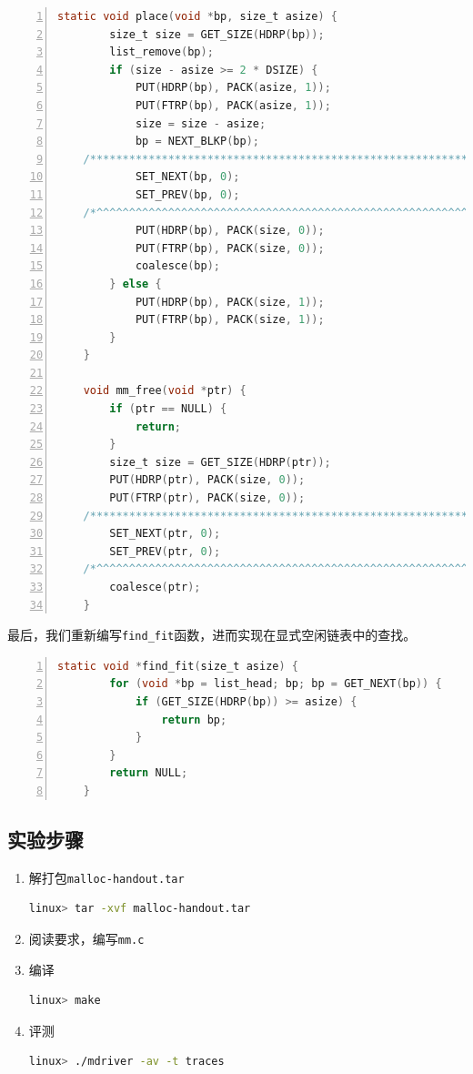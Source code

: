 \documentclass{article}
\begin{document}
\begin{lstlisting}[xleftmargin = 4em,xrightmargin = 3em, aboveskip = 1em, numbers = left, language = C]
    static void place(void *bp, size_t asize) {
        size_t size = GET_SIZE(HDRP(bp));
        list_remove(bp);
        if (size - asize >= 2 * DSIZE) {
            PUT(HDRP(bp), PACK(asize, 1));
            PUT(FTRP(bp), PACK(asize, 1));
            size = size - asize;
            bp = NEXT_BLKP(bp);
    /****************************************************************************/
            SET_NEXT(bp, 0);
            SET_PREV(bp, 0);
    /*^^^^^^^^^^^^^^^^^^^^^^^^^^^^^^^^^^^^^^^^^^^^^^^^^^^^^^^^^^^^^^^^^^^^^^^^^^*/
            PUT(HDRP(bp), PACK(size, 0));
            PUT(FTRP(bp), PACK(size, 0));
            coalesce(bp);
        } else {
            PUT(HDRP(bp), PACK(size, 1));
            PUT(FTRP(bp), PACK(size, 1));
        }
    }

    void mm_free(void *ptr) {
        if (ptr == NULL) {
            return;
        }
        size_t size = GET_SIZE(HDRP(ptr));
        PUT(HDRP(ptr), PACK(size, 0));
        PUT(FTRP(ptr), PACK(size, 0));
    /****************************************************************************/
        SET_NEXT(ptr, 0);
        SET_PREV(ptr, 0);
    /*^^^^^^^^^^^^^^^^^^^^^^^^^^^^^^^^^^^^^^^^^^^^^^^^^^^^^^^^^^^^^^^^^^^^^^^^^^*/
        coalesce(ptr);
    }
\end{lstlisting}

最后，我们重新编写\texttt{find\_fit}函数，进而实现在显式空闲链表中的查找。

\begin{lstlisting}[xleftmargin = 4em,xrightmargin = 4em, aboveskip = 1em, numbers = left, language = C]
    static void *find_fit(size_t asize) {
        for (void *bp = list_head; bp; bp = GET_NEXT(bp)) {
            if (GET_SIZE(HDRP(bp)) >= asize) {
                return bp;
            }
        }
        return NULL;
    }
\end{lstlisting}

\normalsize
\subsection{实验步骤}

\begin{enumerate}[noitemsep, label={{\arabic*})}]
    \item 解打包\texttt{malloc-handout.tar}
          \begin{lstlisting}[language=bash]
    linux> tar -xvf malloc-handout.tar
    \end{lstlisting}
    \item 阅读要求，编写\texttt{mm.c}
    \item 编译
          \begin{lstlisting}[language=bash]
    linux> make
    \end{lstlisting}
    \item 评测
          \begin{lstlisting}[language=bash]
    linux> ./mdriver -av -t traces
    \end{lstlisting}

\end{enumerate}
\normalsize
\end{document}
